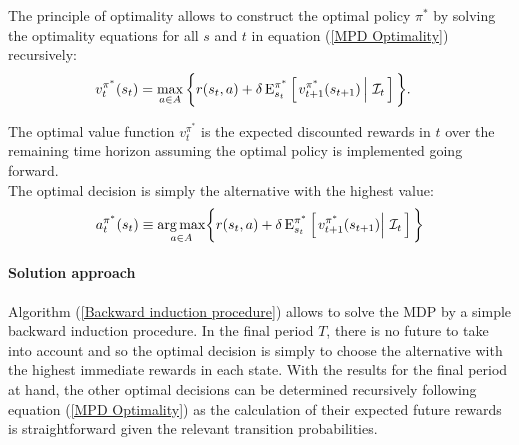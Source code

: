 \noindent The principle of optimality allows to construct the optimal policy $\pi^*$ by solving the optimality equations for all $s$ and $t$ in equation (\ref{MPD Optimality}) recursively:
%
\begin{align}\label{MPD Optimality}
v^{\pi^*}_t(s_t)  & = \max_{a \in A}\bigg\{ r(s_t, a) + \delta\, \mathrm{E}^{\pi^*}_{s_t} \left[\left.v^{\pi^*}_{t + 1}(s_{t + 1})\,\right\vert\,\mathcal{I}_t\,\right] \bigg\}.
\end{align}

\noindent The optimal value function $v^{\pi^*}_t$ is the expected discounted rewards in $t$ over the remaining time horizon assuming the optimal policy is implemented going forward.\\

\noindent The optimal decision is simply the alternative with the highest value:
%
\begin{align*}
a^{\pi^*}_t(s_t) \equiv \underset{a\in A}{\operatorname*{arg\,max}} \bigg\{ r(s_t, a) + \delta\,\mathrm{E}^{\pi^*}_{s_t} \left[\left.v^{\pi^*}_{t + 1}(s_{t + 1})\right\vert\,\mathcal{I}_t\,\right] \bigg\}
\end{align*}

\paragraph{Solution approach} Algorithm (\ref{Backward induction procedure}) allows to solve the MDP by a simple backward induction procedure. In the final period $T$, there is no future to take into account and so the optimal decision is simply to choose the alternative with the highest immediate rewards in each state. With the results for the final period at hand, the other optimal decisions can be determined recursively following equation (\ref{MPD Optimality}) as the calculation of their expected future rewards is straightforward given the relevant transition probabilities.

\vspace{0.5cm}\FloatBarrier

